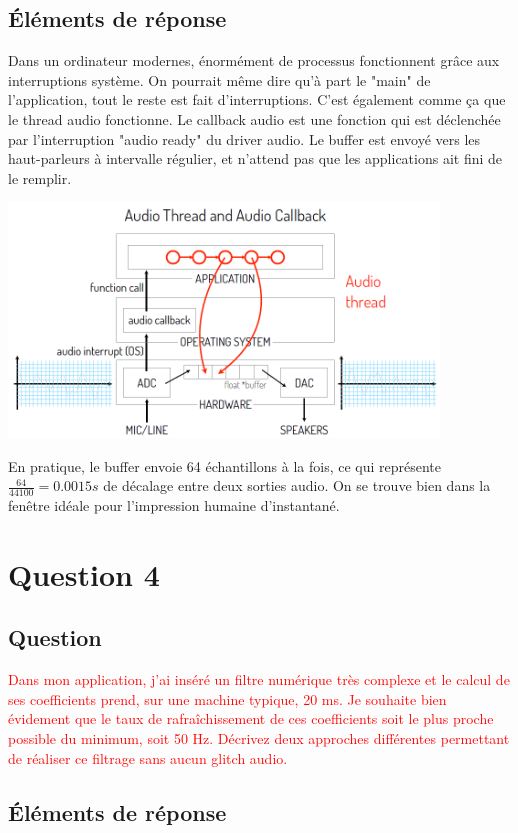 \documentclass[letterpaper, 12pt]{article}
\newcommand{\alinea}{
\hspace*{0.5cm}}
\newcommand{\red}[1]{
	\textcolor{red}{#1}}
\begin{document}
		\subsection{\'Eléments de réponse}
			\alinea Dans un ordinateur modernes, énormément de processus fonctionnent grâce aux interruptions système.
				On pourrait même dire qu'à part le "main" de l'application, tout le reste est fait d'interruptions.
				C'est également comme ça que le thread audio fonctionne. Le callback audio est une fonction qui est déclenchée
				par l'interruption "audio ready" du driver audio. Le buffer est envoyé vers les haut-parleurs à intervalle
				régulier, et n'attend pas que les applications ait fini de le remplir.
			\begin{center}
				\includegraphics[width=4.5in]{Images/callback}
			\end{center}
			\alinea En pratique, le buffer envoie 64 échantillons à la fois, ce qui représente $ \frac{64}{44100} = 0.0015s$
				de décalage entre deux sorties audio. On se trouve bien dans la fenêtre idéale pour l'impression humaine d'instantané.
	\section{Question 4}
		\subsection{Question}
			\alinea \red{Dans mon application, j’ai inséré un filtre numérique très complexe et le calcul de ses coefficients prend, sur 
				une machine typique, 20 ms. Je souhaite bien évidement que le taux de rafraîchissement de ces coefficients soit le 
				plus proche possible du minimum, soit 50 Hz. Décrivez deux approches différentes permettant de réaliser ce filtrage 
				sans aucun glitch audio.}
		\subsection{\'Eléments de réponse}
\end{document}
